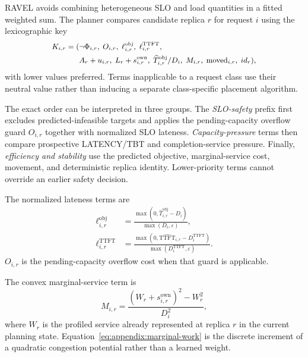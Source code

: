 RAVEL avoids combining heterogeneous SLO and load quantities in a fitted
weighted sum.
The planner compares candidate replica $r$ for request $i$ using the
lexicographic key
\begin{equation}
\small
\begin{split}
    K_{i,r} =
    (&
      \neg\Phi_{i,r},\;
      O_{i,r},\;
      \ell^{\mathrm{obj}}_{i,r},\;
      \ell^{\mathrm{TTFT}}_{i,r},\\
     &A_r+u_{i,r},\;
      L_r+s^{\mathrm{own}}_{i,r},\;
      \widehat{T}^{\mathrm{obj}}_{i,r}/D_i,\;
      M_{i,r},\;
      \mathrm{moved}_{i,r},\;
      id_r
    ),
    \label{eq:appendix:placement-key}
\end{split}
\end{equation}
with lower values preferred.
Terms inapplicable to a request class use their neutral value rather than
inducing a separate class-specific placement algorithm.

The exact order can be interpreted in three groups.
The \emph{SLO-safety} prefix first excludes predicted-infeasible targets and
applies the pending-capacity overflow guard $O_{i,r}$ together with normalized
SLO lateness.
\emph{Capacity-pressure} terms then compare prospective LATENCY/TBT and
completion-service pressure.
Finally, \emph{efficiency and stability} use the predicted objective,
marginal-service cost, movement, and deterministic replica identity.
Lower-priority terms cannot override an earlier safety decision.

The normalized lateness terms are
\begin{align}
    \ell^{\mathrm{obj}}_{i,r}
    &=
    \frac{
        \max(0,\widehat{T}^{\mathrm{obj}}_{i,r}-D_i)
    }{\max(D_i,\varepsilon)},
    \label{eq:appendix:objective-lateness}\\
    \ell^{\mathrm{TTFT}}_{i,r}
    &=
    \frac{
        \max(0,\widehat{\mathrm{TTFT}}_{i,r}
                  -D_i^{\mathrm{TTFT}})
    }{\max(D_i^{\mathrm{TTFT}},\varepsilon)}.
    \label{eq:appendix:ttft-lateness}
\end{align}
$O_{i,r}$ is the pending-capacity overflow cost when that guard is applicable.

The convex marginal-service term is
\begin{equation}
    M_{i,r}
    =
    \frac{
       (W_r+s^{\mathrm{own}}_{i,r})^2-W_r^2
    }{D_i^2},
    \label{eq:appendix:marginal-work}
\end{equation}
where $W_r$ is the profiled service already represented at replica $r$ in the
current planning state.
Equation~\ref{eq:appendix:marginal-work} is the discrete increment of a
quadratic congestion potential rather than a learned weight.

